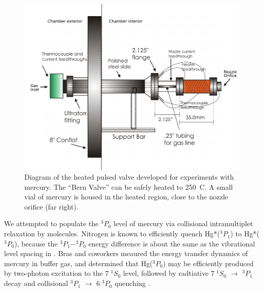 \documentclass[12pt]{mitthesis}
\begin{document}
\begin{figure}
  \caption{Diagram of the heated pulsed valve developed for
    experiments with mercury.  The ``Bern Valve'' can be safely heated
    to 250\degrees\ C.  A small vial of mercury is housed in the
    heated region, close to the nozzle orifice (far right).}
  \label{fig:bern-diagram}
  \centering
  \vspace{1cm}
  \includegraphics[width=6.3in, trim=1cm 0 0 0]{bern-diagram.pdf}
  \vspace{1in}
\end{figure}

We attempted to populate the $^3P_0$ level of mercury via collisional
intramultiplet relaxation by  molecules.  Nitrogen is known to
efficiently quench Hg*($^3P_1$) to Hg*($^3P_0$), because the
$^3P_1-^3P_0$ energy difference is about the same as the vibrational
level spacing in  \cite{callear70, horiguchi71, mitchell61}.
Bras and coworkers meaured the energy transfer dynamics of mercury in
 buffer gas, and determined that Hg($^3P_0$) may be efficiently
produced by two-photon excitation to the $7 \; ^1S_0$ level, followed
by radtiative $7 \; ^1S_0$ $\rightarrow$ $^3P_1$ decay and collisional
$^3P_1$ $\rightarrow$ $6 \; ^3P_0$ quenching \cite{bras93}.
\end{document}
